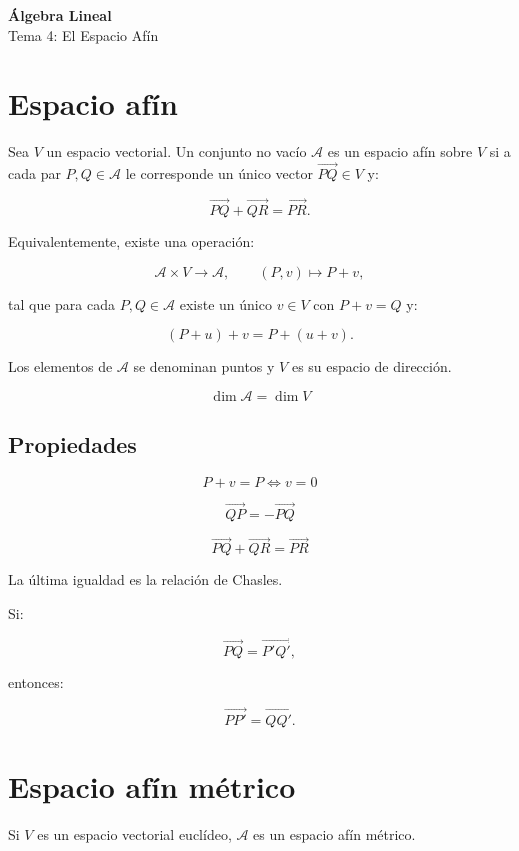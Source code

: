 \documentclass[11pt,a4paper]{article}
\begin{document}
\begin{center}
{\LARGE\bfseries Álgebra Lineal}\\[0.4em]
{\Large Tema 4: El Espacio Afín}
\end{center}

\tableofcontents
\newpage

\section{Espacio afín}

Sea $V$ un espacio vectorial. Un conjunto no vacío $\mathcal A$ es un espacio afín sobre $V$ si a cada par $P,Q\in\mathcal A$ le corresponde un único vector $\overrightarrow{PQ}\in V$ y:

\[
\overrightarrow{PQ}+\overrightarrow{QR}=\overrightarrow{PR}.
\]

Equivalentemente, existe una operación:

\[
\mathcal A\times V\longrightarrow\mathcal A,
\qquad
(P,v)\longmapsto P+v,
\]

tal que para cada $P,Q\in\mathcal A$ existe un único $v\in V$ con $P+v=Q$ y:

\[
(P+u)+v=P+(u+v).
\]

Los elementos de $\mathcal A$ se denominan puntos y $V$ es su espacio de dirección.

\[
\boxed{\dim\mathcal A=\dim V}
\]

\subsection{Propiedades}

\[
P+v=P\iff v=0
\]

\[
\overrightarrow{QP}=-\overrightarrow{PQ}
\]

\[
\boxed{\overrightarrow{PQ}+\overrightarrow{QR}=\overrightarrow{PR}}
\]

La última igualdad es la relación de Chasles.

Si:

\[
\overrightarrow{PQ}=\overrightarrow{P'Q'},
\]

entonces:

\[
\boxed{\overrightarrow{PP'}=\overrightarrow{QQ'}}.
\]

\section{Espacio afín métrico}

Si $V$ es un espacio vectorial euclídeo, $\mathcal A$ es un espacio afín métrico.
\end{document}
